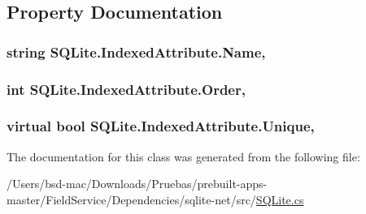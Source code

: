 \subsection{Property Documentation}
\hypertarget{class_s_q_lite_1_1_indexed_attribute_a55689d97d0aca7c218c9677b2ddf2dd0}{
\subsubsection[{Name}]{\setlength{\rightskip}{0pt plus 5cm}string S\+Q\+Lite.\+Indexed\+Attribute.\+Name\hspace{0.3cm}{\ttfamily [get]}, {\ttfamily [set]}}}\label{class_s_q_lite_1_1_indexed_attribute_a55689d97d0aca7c218c9677b2ddf2dd0}
\hypertarget{class_s_q_lite_1_1_indexed_attribute_a5d6a42950339c3ae6060c1065467277a}{
\subsubsection[{Order}]{\setlength{\rightskip}{0pt plus 5cm}int S\+Q\+Lite.\+Indexed\+Attribute.\+Order\hspace{0.3cm}{\ttfamily [get]}, {\ttfamily [set]}}}\label{class_s_q_lite_1_1_indexed_attribute_a5d6a42950339c3ae6060c1065467277a}
\hypertarget{class_s_q_lite_1_1_indexed_attribute_a081cfea90b6aba263fb1b02c4897638a}{
\subsubsection[{Unique}]{\setlength{\rightskip}{0pt plus 5cm}virtual bool S\+Q\+Lite.\+Indexed\+Attribute.\+Unique\hspace{0.3cm}{\ttfamily [get]}, {\ttfamily [set]}}}\label{class_s_q_lite_1_1_indexed_attribute_a081cfea90b6aba263fb1b02c4897638a}


The documentation for this class was generated from the following file\+:\begin{DoxyCompactItemize}
\item 
/\+Users/bsd-\/mac/\+Downloads/\+Pruebas/prebuilt-\/apps-\/master/\+Field\+Service/\+Dependencies/sqlite-\/net/src/\hyperlink{_s_q_lite_8cs}{S\+Q\+Lite.\+cs}\end{DoxyCompactItemize}
